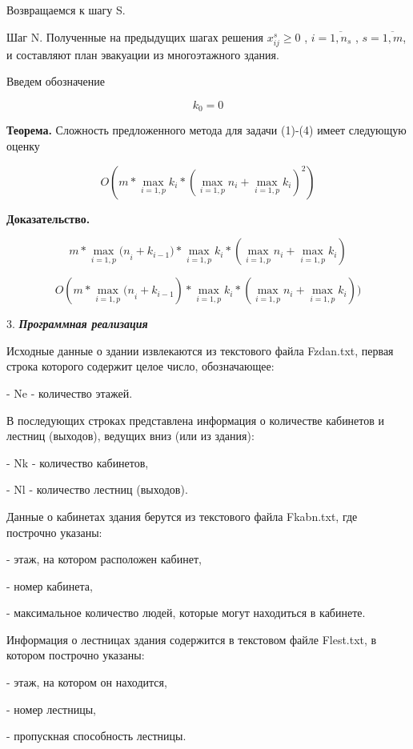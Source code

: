 \begin{multicols}{2}
Возвращаемся к шагу S.

Шаг N. Полученные на предыдущих шагах решения \(x_{ij}^{s} \geq 0\) ,
\(i = \overline{1,n_{s}}\) , \(s = \overline{1,m}\), и составляют план
эвакуации из многоэтажного здания.

Введем обозначение

\begin{equation}
k_{0} = 0
\end{equation}

{\bfseries Теорема.} Сложность предложенного метода для задачи (1)-(4)
имеет следующую оценку

\begin{equation}
O(m \ast \max_{i = 1,p}k_{i} \ast {(\max_{i = 1,p}n_{i} + \max_{i = 1,p}k_{i})}^{2})
\end{equation}

{\bfseries Доказательство.}

\[m \ast \max_{i = 1,p}{(n}_{i} + k_{i - 1}) \ast \max_{i = 1,p}k_{i} \ast \left( \max_{i = 1,p}n_{i} + \max_{i = 1,p}k_{i} \right)\]

\[O(m \ast \max_{i = 1,p}{(n}_{i} + k_{i - 1}) \ast \max_{i = 1,p}k_{i} \ast (\max_{i = 1,p}n_{i} + \max_{i = 1,p}k_{i}))\]

3. \emph{{\bfseries Программная реализация}}

Исходные данные о здании извлекаются из текстового файла Fzdan.txt,
первая строка которого содержит целое число, обозначающее:

- Ne - количество этажей.

В последующих строках представлена информация о количестве кабинетов и
лестниц (выходов), ведущих вниз (или из здания):

- Nk - количество кабинетов,

- Nl - количество лестниц (выходов).

Данные о кабинетах здания берутся из текстового файла Fkabn.txt, где
построчно указаны:

- этаж, на котором расположен кабинет,

- номер кабинета,

- максимальное количество людей, которые могут находиться в кабинете.

Информация о лестницах здания содержится в текстовом файле Flest.txt, в
котором построчно указаны:

- этаж, на котором он находится,

- номер лестницы,

- пропускная способность лестницы.


\end{multicols}
